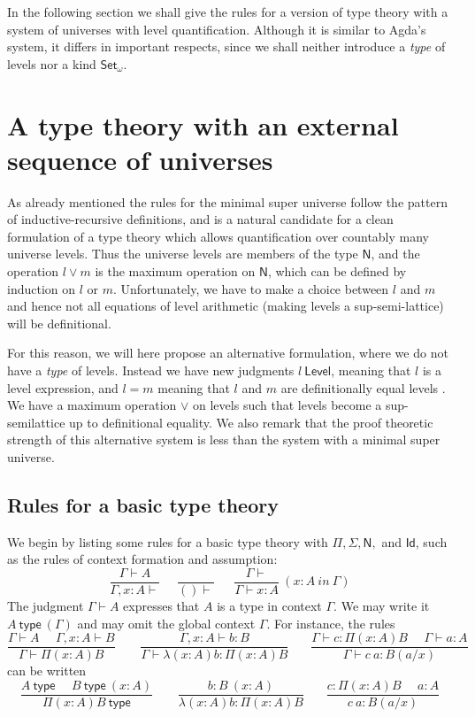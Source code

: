 \documentclass[11pt,a4paper]{article}
\newcommand{\Id}{\mathsf{Id}}
\def\Level{\mathsf{Level}}
\newcommand{\type}{\mathsf{type}}
\newcommand{\N}{\mathsf{N}}
\newcommand{\Set}{\mathsf{Set}}
\begin{document}
In the following section we shall give the rules for a version of type theory with a system of universes with level quantification. Although it is similar to Agda's system, it differs in important respects, since we shall neither introduce a {\em type} of levels nor a kind $\Set_\omega$.

\section{A type theory with an external sequence of universes}\label{sec:external}

As already mentioned the rules for the minimal super universe follow the pattern of inductive-recursive definitions, and is a natural candidate for a clean formulation of a type theory which allows quantification over countably many universe levels. Thus the universe levels are members of the type $\N$, and the operation $l \vee m$ is the maximum operation on $\N$, which can be defined by induction on $l$ or $m$. Unfortunately, we have to make a choice between $l$ and $m$ and hence not all equations of level arithmetic (making levels a sup-semi-lattice) will be definitional.

For this reason, we will here propose an alternative formulation, where we do not have a {\em type} of levels. Instead we have new judgments $l\ \Level$, meaning that $l$ is a level expression, and $l = m$ meaning that $l$ and $m$ are definitionally equal levels . We have a maximum operation $\vee$ on levels such that levels become a sup-semilattice up to definitional equality. We also remark that the proof theoretic strength of this alternative system is less than the system with a minimal super universe.

\subsection*{Rules for a basic type theory}

We begin by listing some rules for a basic type theory with $\Pi, \Sigma, \N,$ and $\Id$, such as the rules of context formation and assumption:
$$
\frac{\Gamma\vdash A}{\Gamma,x:A\vdash}~~~~~~\frac{}{()\vdash}~~~~~~~
\frac{\Gamma\vdash}{\Gamma\vdash x:A}~(x\!:\! A~in~\Gamma)
$$
The judgment $\Gamma\vdash A$ expresses that $A$ is a type in context $\Gamma$.
We may write it $A~\type~(\Gamma)$ and may omit the global context $\Gamma$.
For instance, the rules
$$
\frac{\Gamma\vdash A~~~~~~\Gamma,x:A\vdash B}{\Gamma\vdash \Pi (x:A) B}~~~~~~~~~
\frac{\Gamma,x:A\vdash b:B}{\Gamma\vdash \lambda (x:A) b:\Pi (x:A) B}~~~~~~~~
\frac{\Gamma\vdash c:\Pi (x:A) B~~~~~~\Gamma\vdash a:A}
     {\Gamma\vdash c~a:B(a/x)}
$$
can be written
$$
\frac{A~\type~~~~~~B~\type~(x:A)}{\Pi (x:A) B~\type}~~~~~~~~~
\frac{b:B~(x:A)}{\lambda (x:A) b:\Pi (x:A) B}~~~~~~~~
\frac{c:\Pi (x:A) B~~~~~~a:A}
     {c~a:B(a/x)}
$$
\end{document}
